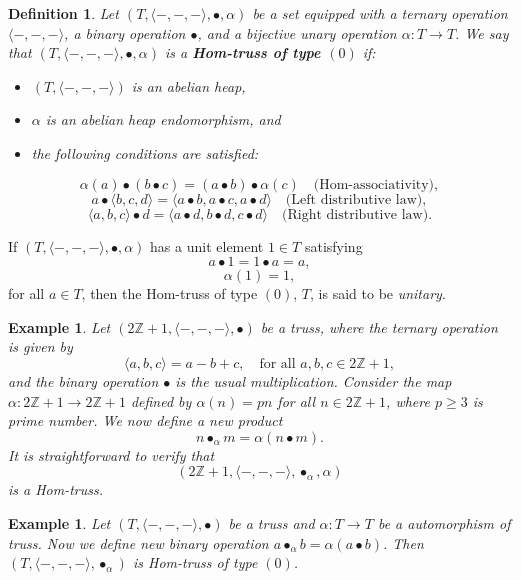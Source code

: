 \documentclass[14pt]{article}
\theoremstyle{Definition}
\newtheorem{Def}[thm]{Definition}
\newtheorem{Exam}[thm]{Example}
\theoremstyle{remark}
\begin{document}
\begin{Def}\label{de1}
Let $(T, \langle -,-,- \rangle, \bullet, \alpha)$ be a set equipped with a ternary operation $\langle -,-,- \rangle$, a binary operation $\bullet$, and a bijective unary operation $\alpha : T \rightarrow T$.  
We say that $(T, \langle -,-,- \rangle, \bullet, \alpha)$ is a \textbf{Hom-truss of type $(0)$} if:
\begin{itemize}
    \item[(I)] $(T, \langle -,-,- \rangle)$ is an abelian heap,
    \item[(II)] $\alpha$ is an abelian heap endomorphism, and
    \item[(III)] the following conditions are satisfied:
\end{itemize}
\[
\alpha(a) \bullet (b \bullet c) = (a \bullet b) \bullet \alpha(c) 
\quad \text{(Hom-associativity)},
\]
\[
a \bullet \langle b, c, d \rangle = \langle a \bullet b, a \bullet c, a \bullet d \rangle 
\quad \text{(Left distributive law)},
\]
\[
\langle a, b, c \rangle \bullet d = \langle a \bullet d, b \bullet d, c \bullet d \rangle 
\quad \text{(Right distributive law)}.
\]
\end{Def}
If $(T,\langle-,-,- \rangle,\bullet,\alpha)$ has a unit element $1 \in T$ satisfying  
\begin{equation*}
a \bullet 1 = 1 \bullet a =a,
\end{equation*}
\begin{equation*}
\alpha(1)= 1,
\end{equation*}
for all $a \in T$, then the Hom-truss of type $(0)$, $T$, is said to be \emph{unitary}.
\begin{Exam}
Let $\left( 2\mathbb{Z} + 1, \langle -,-,- \rangle, \bullet \right)$ be a truss, where the ternary operation is given by  
\[
\langle a, b, c \rangle = a - b + c, \quad \text{for all } a,b,c \in 2\mathbb{Z} + 1,
\]  
and the binary operation $\bullet$ is the usual multiplication.  
Consider the map $\alpha : 2\mathbb{Z} + 1 \rightarrow 2\mathbb{Z} + 1$ defined by $\alpha(n) = pn$ for all $n \in 2\mathbb{Z} + 1$, where $p\geq 3$ is prime number.  
We now define a new product
\[
n \bullet_{\alpha} m = \alpha(n \bullet m).
\]  
It is straightforward to verify that  
\[
\left( 2\mathbb{Z} + 1, \langle -,-,- \rangle, \bullet_{\alpha}, \alpha \right)
\]  
is a Hom-truss.
\end{Exam}
\begin{Exam}
Let $(T,\langle -,-,- \rangle,\bullet)$ be a truss and $\alpha:T\rightarrow T$ be a automorphism of truss. Now we define new binary operation $a\bullet_{\alpha}b=\alpha(a\bullet b)$. Then $(T,\langle -,-,- \rangle,\bullet_{\alpha})$ is Hom-truss of type $(0)$.
\end{Exam}
\end{document}
